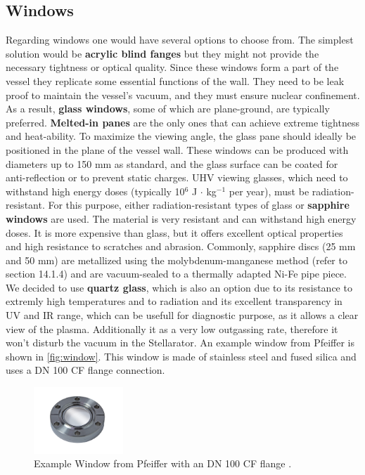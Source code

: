 \subsection{Windows}
Regarding windows one would have several options to choose from.
The simplest solution would be \textbf{acrylic blind fanges} but they might not provide the necessary tightness or optical quality.
Since these windows form a part of the vessel they replicate some essential functions of the wall.
They need to be leak proof to maintain the vessel's vacuum, and they must ensure nuclear confinement.
As a result, \textbf{glass windows}, some of which are plane-ground, are typically preferred.
\textbf{Melted-in panes} are the only ones that can achieve extreme tightness and heat-ability.
To maximize the viewing angle, the glass pane should ideally be positioned in the plane of the vessel wall.
These windows can be produced with diameters up to 150 mm as standard, and the glass surface can be coated for anti-reflection or to prevent static charges. UHV viewing glasses, which need to withstand high energy doses (typically 10$^6$ J $\cdot$ kg$^{-1}$ per year), must be radiation-resistant.
For this purpose, either radiation-resistant types of glass or \textbf{sapphire windows} are used.
The material is very resistant and can withstand high energy doses. It is more expensive than glass, but it offers excellent optical properties and high resistance to scratches and abrasion.
Commonly, sapphire discs (25 mm and 50 mm) are metallized using the molybdenum-manganese method (refer to section 14.1.4) and are vacuum-sealed to a thermally adapted Ni-Fe pipe piece.\cite{Wutz2000} We decided to use \textbf{quartz glass}, which is also an option due to its resistance to extremly high temperatures and to radiation and its excellent transparency in UV and IR range, which can be usefull for diagnostic purpose, as it allows a clear view of the plasma.
Additionally it as a very low outgassing rate, therefore it won't disturb the vacuum in the Stellarator.
An example window from Pfeiffer is shown in \autoref{fig:window}.
This window is made of stainless steel and fused silica and uses a DN 100 CF flange connection.



\begin{figure}[H]
    \centering
    \includegraphics[width=0.3\textwidth]{sections/imges/ports/vacuum_window.png}
    \caption{Example Window from Pfeiffer with an DN 100 CF flange \cite{pfeiffer_window}.}
    \label{fig:window}
\end{figure}



